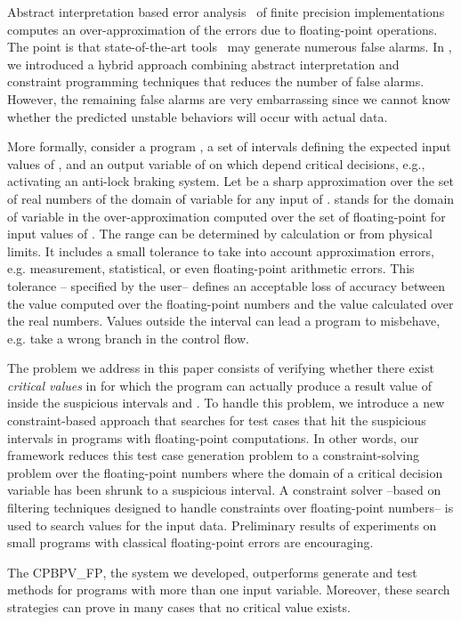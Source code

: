 \documentclass[a4paper]{llncs}
\newcommand{\eg}{e.g.}
\newcommand{\OUR}{\textsc{CPBPV\_FP}}
\begin{document}
Abstract interpretation based error
analysis~\cite{Chen2008} of
finite precision implementations computes an over-approximation of the
errors due to floating-point operations. The point is that state-of-the-art
tools~\cite{delmasGoubaultPutotSouyrisTekkalVedrine09}
may generate numerous false alarms. In \cite{ponsiniMichelRueher14}, we
introduced a hybrid approach combining abstract interpretation
and constraint programming techniques that reduces the number of false
alarms. However, the remaining false alarms are very embarrassing since
we cannot know  whether the predicted unstable behaviors will occur with actual data.


More formally, consider a program , a set of intervals  defining
the expected input values of , and an output variable  of 
on which depend critical decisions, e.g., activating
an anti-lock braking system. Let  be   a
sharp approximation over the set of real numbers  of the domain of variable  for any  input of
.   stands for the domain of variable  in
the over-approximation computed over the set of floating-point 
for input values of . The range  can
be determined by calculation or from physical limits. It  includes a small tolerance to take
into account approximation errors, \eg{} measurement, statistical, or
even floating-point arithmetic errors. This tolerance -- specified by the user-- defines an acceptable
loss of accuracy between the value computed over the floating-point
numbers and the value calculated over the real numbers. Values outside the
interval  can lead a
program to misbehave, \eg{} take a wrong branch in the control flow.


The problem we address in this paper consists of verifying whether
there exist {\em critical values} in  for which the
program can actually produce a result value of   inside the suspicious intervals
 and
.  To handle this problem, we introduce a
new constraint-based approach that searches for test cases that hit the
suspicious intervals in programs with floating-point computations.
In other words, our framework reduces this test case generation
problem to a constraint-solving problem over the floating-point
numbers where the domain of a critical decision variable has been shrunk to
a suspicious interval.  A constraint solver --based on filtering
techniques designed to handle constraints over floating-point
numbers-- is used to search values for the input data.
Preliminary results of experiments  on small programs with
classical floating-point errors are encouraging.


The  \OUR{}, the system we developed,  outperforms generate and test methods for programs with more than one input variable.
Moreover, these search strategies can prove in many cases that no critical value exists.  
\end{document}
